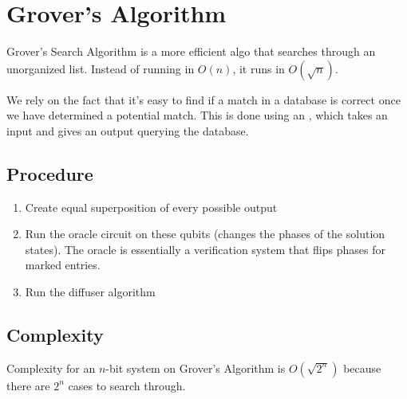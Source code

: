\section{Grover's Algorithm}
Grover's Search Algorithm is a more efficient algo that searches through an unorganized list. Instead of running in $O(n)$, it runs in $O(\sqrt n)$.

We rely on the fact that it's easy to find if a match in a database is correct once we have determined a potential match. This is done using an , which takes an input and gives an output querying the database.

\subsection{Procedure}
\begin{enumerate}
    \item Create equal superposition of every possible output
    \item Run the oracle circuit on these qubits (changes the phases of the solution states). The oracle is essentially a verification system that flips phases for marked entries.
    \item Run the diffuser algorithm
\end{enumerate}

\subsection{Complexity}
Complexity for an $n$-bit system on Grover's Algorithm is $O(\sqrt{2^n})$ because there are $2^n$ cases to search through.
